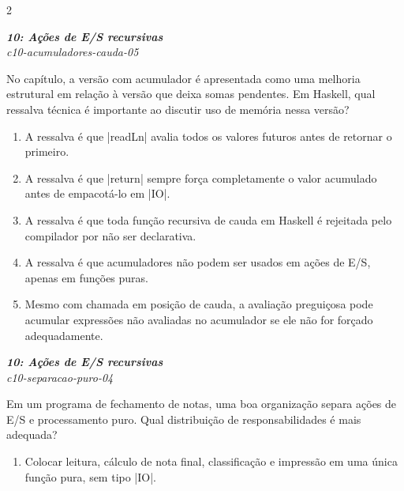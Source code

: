 \documentclass[a4paper,10pt,brazil]{article}
\begin{document}
\begin{multicols}{2}
\begin{enumerate}
\end{enumerate}

\begin{flushright}
  \footnotesize
  \textit{\textbf{10: Ações de E/S recursivas}}\\
  \textit{c10-acumuladores-cauda-05}\\

\end{flushright}
No capítulo, a versão com acumulador é apresentada como uma melhoria estrutural em relação à versão que deixa somas pendentes. Em Haskell, qual ressalva técnica é importante ao discutir uso de memória nessa versão?

\begin{enumerate}
  \item A ressalva é que \haskellinline|readLn| avalia todos os valores futuros antes de retornar o primeiro.

  \item A ressalva é que \haskellinline|return| sempre força completamente o valor acumulado antes de empacotá-lo em \haskellinline|IO|.

  \item A ressalva é que toda função recursiva de cauda em Haskell é rejeitada pelo compilador por não ser declarativa.

  \item A ressalva é que acumuladores não podem ser usados em ações de E/S, apenas em funções puras.

  \item Mesmo com chamada em posição de cauda, a avaliação preguiçosa pode acumular expressões não avaliadas no acumulador se ele não for forçado adequadamente.


\end{enumerate}

\begin{flushright}
  \footnotesize
  \textit{\textbf{10: Ações de E/S recursivas}}\\
  \textit{c10-separacao-puro-04}\\

\end{flushright}
Em um programa de fechamento de notas, uma boa organização separa ações de E/S e processamento puro. Qual distribuição de responsabilidades é mais adequada?

\begin{enumerate}
  \item Colocar leitura, cálculo de nota final, classificação e impressão em uma única função pura, sem tipo \haskellinline|IO|.


\end{enumerate}
\end{multicols}
\end{document}
